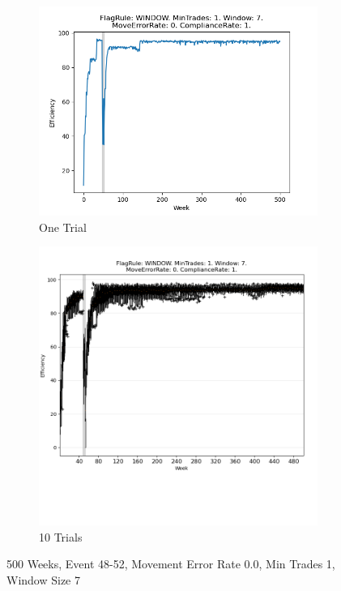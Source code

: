 \documentclass{article}%
\begin{document}
%


\begin{figure}[!htb]%
\begin{subfigure}[b]{0.45\linewidth}%
\includegraphics[width=\linewidth]{1049fr_WINDOW_mt_1_ws_7_er_0_cr_1_t1.png}%
\caption{One Trial}%
\end{subfigure}%
\begin{subfigure}[b]{0.45\linewidth}%
\includegraphics[clip,width=\linewidth,trim=0 4cm 0 0]{1049fr_WINDOW_mt_1_ws_7_er_0_cr_1_t10.png}%
\caption{10 Trials}%
\end{subfigure}%
\caption{500 Weeks, Event 48{-}52, Movement Error Rate 0.0, Min Trades 1, Window Size 7}%
\end{figure}
\end{document}
